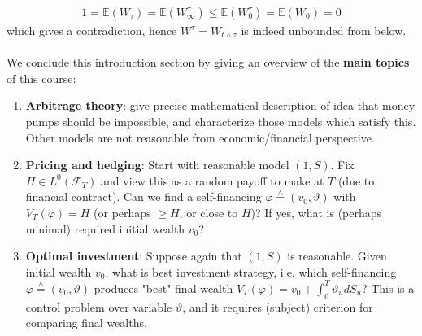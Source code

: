 \documentclass[12pt,a4paper, twoside]{article}
\theoremstyle{definition}
\newcommand{\EE}{\mathbb{E}} %
\newcommand{\teq}{\overset{\wedge}{=}}
\begin{document}
\begin{align*}
1=\EE(W_\tau)=\EE( W_\infty^\tau) \leq \EE( W_0^\tau) = \EE(W_0)=0
\end{align*}
which gives a contradiction, hence $W^\tau = W_{t \wedge \tau}$ is indeed unbounded from below. 
\\\\
We conclude this introduction section by giving an overview of the \textbf{main topics} of this course:
\begin{enumerate}
\item \textbf{Arbitrage theory}: give precise mathematical description of idea that money pumps should be impossible, and characterize those models which satisfy this. Other models are not reasonable from economic/financial perspective.
\item \textbf{Pricing and hedging}: Start with reasonable model $(1,S)$. Fix $H \in L^0( \mathcal{F}_T)$ and view this as a random payoff to make at $T$ (due to financial contract). Can we find a self-financing $\varphi \teq  (v_0, \vartheta)$ with $V_T( \varphi)=H$ (or perhaps $ \geq H$, or close to $H$)? If yes, what is (perhaps minimal) required initial wealth $v_0$?
\item \textbf{Optimal investment}: Suppose again that $(1,S)$ is reasonable. Given initial wealth $v_0$, what is best investment strategy, i.e. which self-financing $\varphi \teq (v_0, \vartheta)$ produces "best" final wealth $V_T( \varphi) = v_0 +  \int_0^T \vartheta_u dS_u$? This is a control problem over variable $\vartheta$, and it requires (subject) criterion for comparing final wealths. 
\end{enumerate}
\newpage
\end{document}
